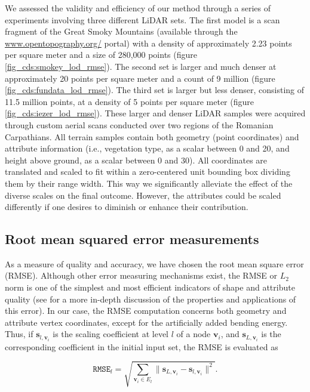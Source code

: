 \documentclass[graybox]{svmult}
\begin{document}
	We assessed the validity and efficiency of our method through a series of experiments involving three different LiDAR sets. The first model is a scan fragment of the Great Smoky Mountains (available through the {\url{www.opentopography.org/}} portal) with a density of approximately 2.23 points per square meter and a size of 280,000 points (figure \ref{fig_cds:smokey_lod_rmse}).  The second set is larger and much denser at approximately 20 points per square meter and a count of 9 million (figure \ref{fig_cds:fundata_lod_rmse}). 
	The third set is larger but less denser, consisting of 11.5 million points, at a density of 5 points per square meter (figure \ref{fig_cds:iezer_lod_rmse}). These larger and denser LiDAR samples were acquired through custom aerial scans conducted over two regions of the Romanian Carpathians. All terrain samples contain both geometry (point coordinates) and attribute information (i.e., vegetation type, as a scalar between 0 and 20, and height above ground, as a scalar between 0 and 30).
	All coordinates are translated and scaled to fit within a zero-centered unit bounding box dividing them by their range width. This way we significantly alleviate the effect of the diverse scales
	on the final outcome. However, the attributes could be scaled
	differently if one desires to diminish or enhance their contribution.
	
	\subsection{Root mean squared error measurements}
	
	As a measure of quality and accuracy, we have chosen the root mean square error (RMSE). Although other error measuring mechanisms exist, the RMSE or $L_2$ norm is one of the simplest and most efficient indicators of shape and attribute quality (see \cite{Payan2006} for a more in-depth discussion of the properties and applications of this error). In our case, the RMSE computation concerns both geometry and attribute vertex coordinates, except for the artificially added bending energy. Thus, if $\mathbf{s}_{l,\mathbf{v}_i}$ is the scaling coefficient at level $l$ of a node $\mathbf{v}_i$, and $\mathbf{s}_{L,\mathbf{v}_i}$ is the corresponding coefficient in the initial input set, the RMSE is evaluated as
	
	\begin{equation}
	\mathtt{RMSE}_l = \sqrt{\sum_{\mathbf{v}_i \in E_l}{ \| \mathbf{s}_{L,\mathbf{v}_i} - \mathbf{s}_{l,\mathbf{v}_i } \|^2 } } .
	\label{eq_cds:RMSE}
	\end{equation}
	
\end{document}

